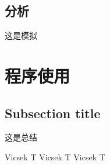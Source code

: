 \documentclass{article}
\begin{document}
\begin{CJK}{UTF8}{gkai}
\subsection{分析}
	这是模拟
\section{程序使用}
\subsection{Subsection title}
        这是总结




\begin{thebibliography}{12345}%
 Vicsek T
 Vicsek T
 Vicsek T


\end{thebibliography}
\end{CJK}
\end{document}
